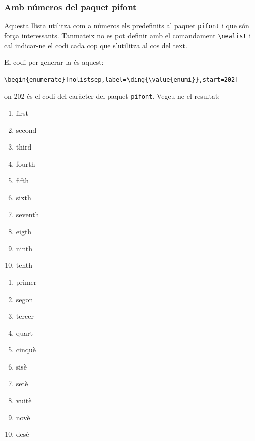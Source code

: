 \documentclass[a4paper,
                             twoside,
                             BCOR1.0cm,
                             DIV11,
                             parskip=full,
                             11pt]{scrbook}
\begin{document}
\subsubsection{Amb números del paquet pifont}\label{ssbsec:pifont}
Aquesta llista utilitza com a números els predefinits al paquet \verb+pifont+ i que són força interessants. Tanmateix no es pot definir amb el comandament \verb+\newlist+ i cal indicar-ne el codi cada cop que s'utilitza al cos del text.

El codi per generar-la és aquest:
\begin{scriptsize}
\begin{verbatim}
\begin{enumerate}[nolistsep,label=\ding{\value{enumi}},start=202]
\end{verbatim}
\end{scriptsize}
on 202 és el codi del caràcter del paquet \verb+pifont+. Vegeu-ne el resultat:


\begin{enumerate}[nolistsep,label=\ding{\value{enumi}},start=172]
\item first
\item second
\item third
\item fourth
\item fifth
\item sixth
\item seventh
\item eigth
\item ninth
\item tenth
\end{enumerate}
\begin{enumerate}[nolistsep,label=\ding{\value{enumi}},start=182]
\item  primer
\item segon
\item tercer
\item quart
\item cinquè
\item sisè
\item setè
\item vuitè
\item novè
\item desè
\end{enumerate}
\end{document}
